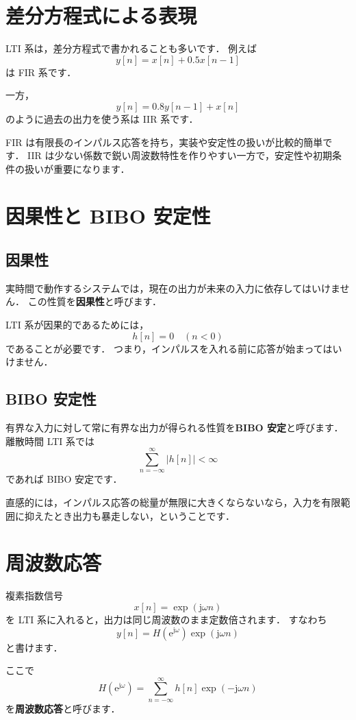 \section{差分方程式による表現}

LTI 系は，差分方程式で書かれることも多いです．
例えば
\[
y[n] = x[n] + 0.5x[n-1]
\]
は FIR 系です．

一方，
\[
y[n] = 0.8 y[n-1] + x[n]
\]
のように過去の出力を使う系は IIR 系です．

FIR は有限長のインパルス応答を持ち，実装や安定性の扱いが比較的簡単です．
IIR は少ない係数で鋭い周波数特性を作りやすい一方で，安定性や初期条件の扱いが重要になります．


\section{因果性と BIBO 安定性}

\subsection{因果性}

実時間で動作するシステムでは，現在の出力が未来の入力に依存してはいけません．
この性質を\textbf{因果性}と呼びます．

LTI 系が因果的であるためには，
\[
h[n] = 0 \quad (n < 0)
\]
であることが必要です．
つまり，インパルスを入れる前に応答が始まってはいけません．


\subsection{BIBO 安定性}

有界な入力に対して常に有界な出力が得られる性質を\textbf{BIBO 安定}と呼びます．
離散時間 LTI 系では
\[
\sum_{n=-\infty}^{\infty} |h[n]| < \infty
\]
であれば BIBO 安定です．

直感的には，インパルス応答の総量が無限に大きくならないなら，入力を有限範囲に抑えたとき出力も暴走しない，ということです．


\section{周波数応答}

複素指数信号
\[
x[n] = \exp(\mathrm{j}\omega n)
\]
を LTI 系に入れると，出力は同じ周波数のまま定数倍されます．
すなわち
\[
y[n] = H(\mathrm{e}^{\mathrm{j}\omega}) \exp(\mathrm{j}\omega n)
\]
と書けます．

ここで
\[
H(\mathrm{e}^{\mathrm{j}\omega}) = \sum_{n=-\infty}^{\infty} h[n]\exp(-\mathrm{j}\omega n)
\]
を\textbf{周波数応答}と呼びます．

